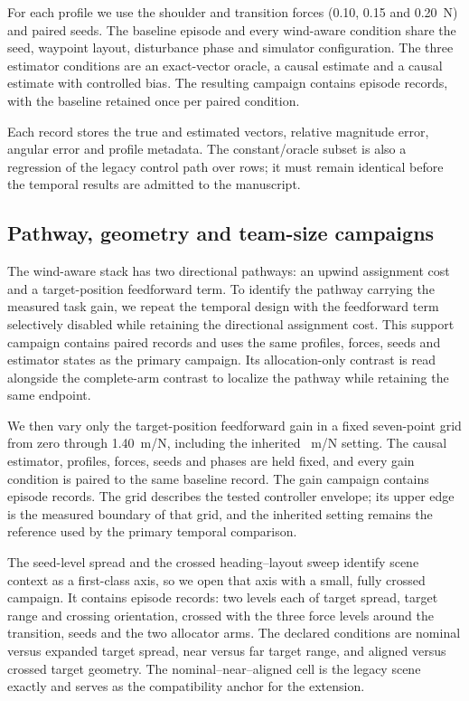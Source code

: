 For each profile we use the shoulder and transition forces (0.10, 0.15 and
0.20~N) and \NTemporalSeeds{} paired seeds. The baseline episode and every wind-aware condition
share the seed, waypoint layout, disturbance phase and simulator configuration. The
three estimator conditions are an exact-vector oracle, a causal estimate and a
causal estimate with controlled bias. The resulting campaign contains
\NTemporalEpisodes{} episode records, with the baseline retained once per paired
condition.

Each record stores the true and estimated vectors, relative magnitude error, angular
error and profile metadata. The constant/oracle subset is also a regression of the
legacy control path over \NTemporalLegacyRows{} rows; it must remain identical before
the temporal results are admitted to the manuscript.

\subsection{Pathway, geometry and team-size campaigns}

The wind-aware stack has two directional pathways: an upwind assignment cost and a
target-position feedforward term. To identify the pathway carrying the measured task
gain, we repeat the temporal design with the feedforward term selectively disabled
while retaining the directional assignment cost. This support campaign contains
\NAblationEpisodes{} paired records and uses the same profiles, forces, seeds and
estimator states as the primary campaign. Its allocation-only contrast is read
alongside the complete-arm contrast to localize the pathway while retaining the
same endpoint.

We then vary only the target-position feedforward gain in a fixed seven-point grid
from zero through 1.40~m/N, including the inherited \FeedforwardGainDefault{}~m/N
setting. The causal estimator, profiles, forces, seeds and phases are held fixed,
and every gain condition is paired to the same baseline record. The gain campaign
contains \NGainEpisodes{} episode records. The grid describes the tested
controller envelope; its upper edge is the measured boundary of that grid, and the
inherited setting remains the reference used by the primary temporal comparison.

The seed-level spread and the crossed heading--layout sweep identify scene context
as a first-class axis, so we open that axis with a small, fully crossed campaign.
It contains \NGeometryEpisodes{} episode records: two levels each of target spread,
target range and crossing orientation, crossed with the three force levels around
the transition, \NGeometrySeeds{} seeds and the two allocator arms. The declared
conditions are nominal versus expanded target spread, near versus far target range,
and aligned versus crossed target geometry. The nominal--near--aligned cell is the
legacy scene exactly and serves as the compatibility anchor for the extension.

